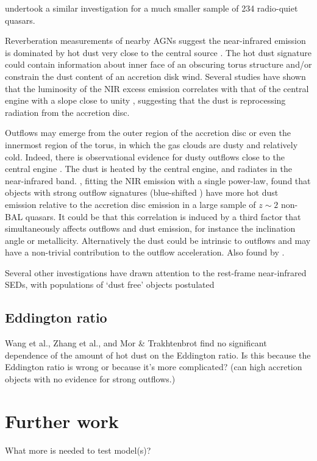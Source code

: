 \citet{gallagher07} undertook a similar investigation for a much smaller sample of 234 radio-quiet quasars.

Reverberation measurements of nearby AGNs suggest the near-infrared emission is dominated by hot dust very close to the central source \citep[few tens of light days; e.g.][]{minezaki04,suganuma06}. 
The hot dust signature could contain information about inner face of an obscuring torus structure and/or constrain the dust content of an accretion disk wind. 
Several studies have shown that the luminosity of the NIR excess emission correlates with that of the central engine with a slope close to unity \cite[e.g.][]{gallagher07}, suggesting that the dust is reprocessing radiation from the accretion disc. 

Outflows may emerge from the outer region of the accretion disc or even the innermost region of the torus, in which the gas clouds are dusty and relatively cold.  
Indeed, there is observational evidence for dusty outflows close to the central engine \citep[e.g.][]{bowler14}.
The dust is heated by the central engine, and radiates in the near-infrared band. 
\citet{wang13}, fitting the NIR emission with a single power-law, found that objects with strong outflow signatures (blue-shifted ) have more hot dust emission relative to the accretion disc emission in a large sample of $z\sim2$ non-BAL quasars. 
It could be that this correlation is induced by a third factor that simultaneously affects outflows and dust emission, for instance the inclination angle or metallicity. 
Alternatively the dust could be intrinsic to outflows and may have a non-trivial contribution to the outflow acceleration.
Also found by \citet{shen14}. 

Several other investigations have drawn attention to the rest-frame near-infrared SEDs, with populations of `dust free' objects postulated \citep{hao10,hao11,jiang10,mor11} 


\subsection{Eddington ratio}

Wang et al., Zhang et al., and Mor \& Trakhtenbrot find no significant dependence of the amount of hot dust on the Eddington ratio. 
Is this because the Eddington ratio is wrong or because it's more complicated? (can high accretion objects with no evidence for strong outflows.)



\section{Further work}

What more is needed to test model(s)?  